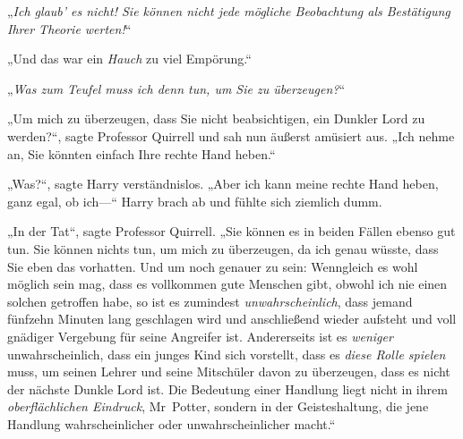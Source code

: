 „\emph{Ich glaub’ es nicht! Sie können nicht jede mögliche Beobachtung als Bestätigung Ihrer Theorie werten!}“

„Und das war ein \emph{Hauch} zu viel Empörung.“

„\emph{Was zum Teufel muss ich denn tun, um Sie zu überzeugen?}“

„Um mich zu überzeugen, dass Sie nicht beabsichtigen, ein Dunkler Lord zu werden?“, sagte Professor Quirrell und sah nun äußerst amüsiert aus. „Ich nehme an, Sie könnten einfach Ihre rechte Hand heben.“

„Was?“, sagte Harry verständnislos. „Aber ich kann meine rechte Hand heben, ganz egal, ob ich—“ Harry brach ab und fühlte sich ziemlich dumm.

„In der Tat“, sagte Professor Quirrell. „Sie können es in beiden Fällen ebenso gut tun. Sie können nichts tun, um mich zu überzeugen, da ich genau wüsste, dass Sie eben das vorhatten. Und um noch genauer zu sein: Wenngleich es wohl möglich sein mag, dass es vollkommen gute Menschen gibt, obwohl ich nie einen solchen getroffen habe, so ist es zumindest \emph{unwahrscheinlich}, dass jemand fünfzehn Minuten lang geschlagen wird und anschließend wieder aufsteht und voll gnädiger Vergebung für seine Angreifer ist. Andererseits ist es \emph{weniger} unwahrscheinlich, dass ein junges Kind sich vorstellt, dass es \emph{diese Rolle spielen} muss, um seinen Lehrer und seine Mitschüler davon zu überzeugen, dass es nicht der nächste Dunkle Lord ist. Die Bedeutung einer Handlung liegt nicht in ihrem \emph{oberflächlichen Eindruck}, Mr~Potter, sondern in der Geisteshaltung, die jene Handlung wahrscheinlicher oder unwahrscheinlicher macht.“

